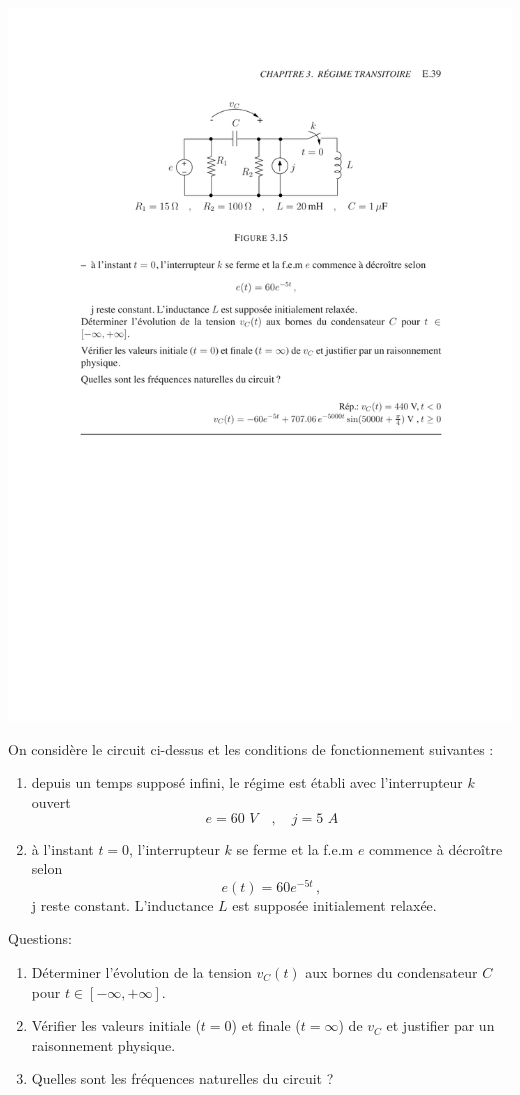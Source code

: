 \begin{exercise}{}
	\label{ex:2-15}
\begin{center}
	\includegraphics[width=0.7\linewidth]{exercices/ex-3-15}
\end{center}
On consid\`ere le circuit ci-dessus et les conditions de fonctionnement suivantes :
\begin{enumerate}
	\item depuis un temps suppos\'e infini, le r\'egime est \'etabli avec
	l'interrupteur $k$ ouvert
	\[e = 60\,\, V \quad , \quad j= 5 \,\, A\]
	\item \`a l'instant $t=0$, l'interrupteur $k$ se ferme  et la f.e.m $e$
	commence \`a d\'ecro\^itre selon 
	\[ e(t)=60 e^{-5t}\, ,\]
	j reste constant. L'inductance $L$ est suppos\'ee initialement relax\'ee.
\end{enumerate}
Questions:
\begin{enumerate}
\item D\'eterminer l'\'evolution de la tension $v_C(t)$ aux bornes du
condensateur $C$ pour $t \in [-\infty,+\infty]$.
\item V\'erifier les valeurs initiale ($t=0$) et finale ($t=\infty$) de $v_C$
et justifier par un raisonnement physique. 
\item Quelles sont les fr\'equences naturelles du circuit ?
\end{enumerate}

\end{exercise}


